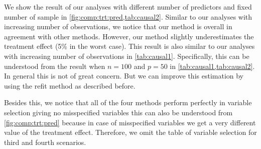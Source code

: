\documentclass[preprint,12pt]{elsarticle}
\begin{document}
We show the result of our analyses with different number of predictors and
fixed number of sample in \cref{fig:comp:trt:pred,tab:causal2}. Similar to
our analyses with increasing number of observations, we notice that our method 
is overall in agreement with
other methods. However, our method slightly
underestimates the treatment effect (5\% in the worst case). 
This result is also similar to our
analyses with increasing number of observations in \cref{tab:causal1}.
Specifically, this can be understood from the result when $n=100$ and 
$p=50$ in \cref{tab:causal1,tab:causal2}. In general this is not of great
concern. But we can improve this estimation by using the refit method
as described before. 

Besides this, we notice that all of the four methods perform
perfectly in variable selection giving no misspecified variables this
can also be understood from \cref{fig:comp:trt:pred} because
in case of misspecified variables we get a very different value
of the treatment effect. Therefore,
we omit the table of variable selection for third and fourth scenarios.
\end{document}
